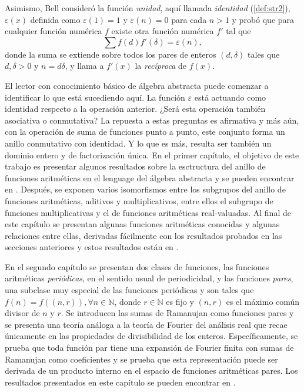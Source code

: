 Asimismo, Bell consideró la función \textit{unidad}, aquí llamada \emph{identidad} (\cref{def:str2}), $\varepsilon(x)$ definida como $\varepsilon(1)=1$ y $\varepsilon(n)=0$ para cada $n>1$ y probó que para cualquier función numérica $f$ existe otra función numérica $f'$ tal que
\begin{equation*}
    \sum f(d) f'(\delta) = \varepsilon(n) \tag{$n=1,2,3,\ldots$},
\end{equation*}
donde la suma se extiende sobre todos los pares de enteros $(d,\delta)$ tales que $d,\delta >0$ y $n = d \delta$, y llama a $f'(x)$ la \textit{recíproca} de $f(x)$.
\bigskip

El lector con conocimiento básico de álgebra abstracta puede comenzar a identificar lo que está sucediendo aquí. La función $\varepsilon$ está actuando como identidad respecto a la operación anterior. ¿Será esta operación también asociativa o conmutativa? La repuesta a estas preguntas es afirmativa y más aún, con la operación de suma de funciones punto a punto, este conjunto forma un anillo conmutativo con identidad. Y lo que es más, resulta ser también un dominio entero y de factorización única. En el primer capítulo, el objetivo de este trabajo es presentar algunos resultados sobre la esctructura del anillo de funciones aritméticas en el lenguage del álgebra abstracta y se pueden encontrar en \cite{Ca1959, Nish1, Bell1}. Después, se exponen varios isomorfismos entre los subgrupos del anillo de funciones aritméticas, aditivos y multiplicativos, entre ellos el subgrupo de funciones multiplicativas y el de funciones aritméticas real-valuadas. Al final de este capítulo se presentan algunas funciones aritméticas conocidas y algunas relaciones entre ellas, derivadas fácilmente con los resultados probados en las secciones anteriores y estos resultados están en \cite{Rea1}.
\bigskip

En el segundo capítulo se presentan dos clases de funciones, las funciones aritméticas \emph{periódicas}, en el sentido usual de periodicidad, y las funciones \emph{pares}, una subclase muy especial de las funciones periódicas y son tales que $f(n)=f((n,r)), \forall n \in \mathbb{N}$, donde $r \in \mathbb{N}$ es fijo y $(n,r)$ es el máximo común divisor de $n$ y $r$. Se introducen las sumas de Ramanujan como funciones pares y se presenta una teoría análoga a la teoría de Fourier del análisis real que recae únicamente en las propiedades de divisibilidad de los enteros. Específicamente, se prueba que toda función par tiene una expansión de Fourier finita con sumas de Ramanujan como coeficientes y se prueba que esta representación puede ser derivada de un producto interno en el espacio de funciones aritméticas pares. Los resultados presentados en este capítulo se pueden encontrar en \cite{Coh1, Knopf1, Knopf2, Murty1}.
\bigskip

